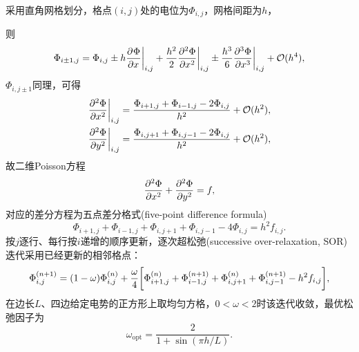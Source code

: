 采用直角网格划分，格点$(i,j)$处的电位为$\Phi_{i,j}$，网格间距为$h$，
\begin{notecaptionblock}
    \label{fig:finite difference method}
\end{notecaptionblock}
则
\[
    \Phi_{i\pm 1,j} = \Phi_{i,j} \pm h\biggeval{\pv\Phi x}_{i,j} + \frac{h^2}2\biggeval{\pv[2]\Phi x}_{i,j} \pm \frac{h^3}6\biggeval{\pv[3]\Phi x}_{i,j} + \bigo(h^4),
\]
$\Phi_{i,j\pm 1}$同理，可得
\begin{subequations}
    \begin{align}
        \biggeval{\pv[2]\Phi x}_{i,j} &= \frac{\Phi_{i+1,j} + \Phi_{i-1,j} - 2\Phi_{i,j}}{h^2} + \bigo(h^2),\\
        \biggeval{\pv[2]\Phi y}_{i,j} &= \frac{\Phi_{i,j+1} + \Phi_{i,j-1} - 2\Phi_{i,j}}{h^2} + \bigo(h^2),
    \end{align}
\end{subequations}
故二维Poisson方程
\[
    \pv[2]\Phi x + \pv[2]\Phi y = f,
\]
对应的差分方程为五点差分格式(five-point difference formula)
\begin{equation}
    \Phi_{i+1,j} + \Phi_{i-1,j} + \Phi_{i,j+1} + \Phi_{i,j-1} - 4\Phi_{i,j} = h^2f_{i,j}.
\end{equation}
按$j$逐行、每行按$i$递增的顺序更新，逐次超松弛(successive over-relaxation, SOR)迭代采用已经更新的相邻格点：
\begin{equation}
    \Phi_{i,j}^{(n+1)} = (1 - \omega)\Phi_{i,j}^{(n)} + \frac\omega4\biggb{\Phi_{i+1,j}^{(n)} + \Phi_{i-1,j}^{(n+1)} + \Phi_{i,j+1}^{(n)} + \Phi_{i,j-1}^{(n+1)} - h^2f_{i,j}},
\end{equation}
在边长$L$、四边给定电势的正方形上取均匀方格，$0 < \omega < 2$时该迭代收敛，最优松弛因子为
\begin{equation}
    \omega_\text{opt} = \frac2{1 + \sin(\pi h/L)}.
\end{equation}
